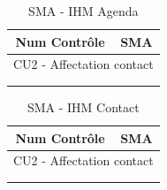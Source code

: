 

\begin{table}[H]
\centering
\caption{SMA - IHM Agenda}
\label{my-label}
\begin{tabular}{ll}
\hline
\multicolumn{1}{c}{Num Contrôle} & \multicolumn{1}{c}{SMA} \\ \hline
\multicolumn{2}{c}{CU2 - Affectation contact}              \\
                                 &                         \\
                                 &                         \\ \hline
\end{tabular}
\end{table}



\begin{table}[H]
\centering
\caption{SMA - IHM Contact}
\label{my-label}
\begin{tabular}{ll}
\hline
\multicolumn{1}{c}{Num Contrôle} & \multicolumn{1}{c}{SMA} \\ \hline
\multicolumn{2}{c}{CU2 - Affectation contact}              \\
                                 &                         \\
                                 &                         \\ \hline
\end{tabular}
\end{table}